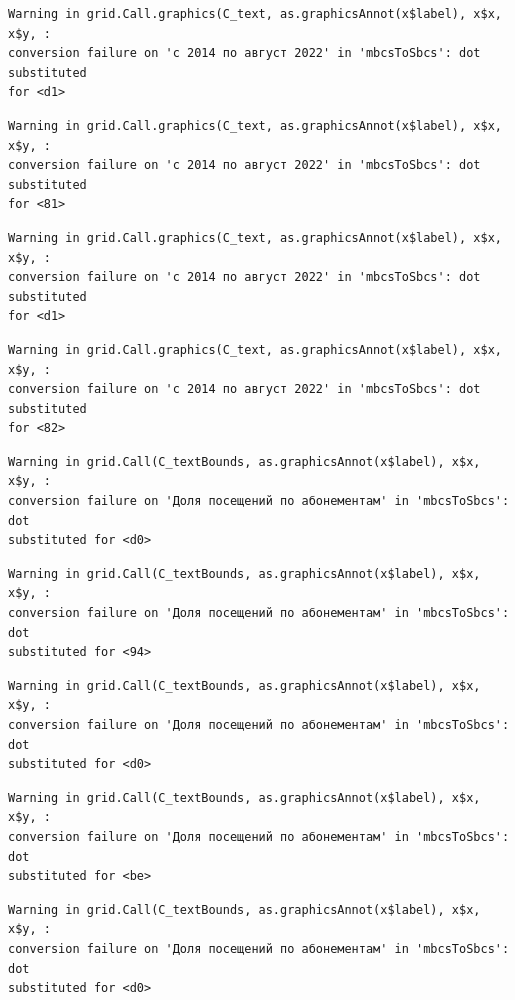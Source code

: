 \documentclass[
  letterpaper,
  DIV=11,
  numbers=noendperiod]{scrartcl}
\begin{document}
\begin{verbatim}
Warning in grid.Call.graphics(C_text, as.graphicsAnnot(x$label), x$x, x$y, :
conversion failure on 'с 2014 по август 2022' in 'mbcsToSbcs': dot substituted
for <d1>
\end{verbatim}

\begin{verbatim}
Warning in grid.Call.graphics(C_text, as.graphicsAnnot(x$label), x$x, x$y, :
conversion failure on 'с 2014 по август 2022' in 'mbcsToSbcs': dot substituted
for <81>
\end{verbatim}

\begin{verbatim}
Warning in grid.Call.graphics(C_text, as.graphicsAnnot(x$label), x$x, x$y, :
conversion failure on 'с 2014 по август 2022' in 'mbcsToSbcs': dot substituted
for <d1>
\end{verbatim}

\begin{verbatim}
Warning in grid.Call.graphics(C_text, as.graphicsAnnot(x$label), x$x, x$y, :
conversion failure on 'с 2014 по август 2022' in 'mbcsToSbcs': dot substituted
for <82>
\end{verbatim}

\begin{verbatim}
Warning in grid.Call(C_textBounds, as.graphicsAnnot(x$label), x$x, x$y, :
conversion failure on 'Доля посещений по абонементам' in 'mbcsToSbcs': dot
substituted for <d0>
\end{verbatim}

\begin{verbatim}
Warning in grid.Call(C_textBounds, as.graphicsAnnot(x$label), x$x, x$y, :
conversion failure on 'Доля посещений по абонементам' in 'mbcsToSbcs': dot
substituted for <94>
\end{verbatim}

\begin{verbatim}
Warning in grid.Call(C_textBounds, as.graphicsAnnot(x$label), x$x, x$y, :
conversion failure on 'Доля посещений по абонементам' in 'mbcsToSbcs': dot
substituted for <d0>
\end{verbatim}

\begin{verbatim}
Warning in grid.Call(C_textBounds, as.graphicsAnnot(x$label), x$x, x$y, :
conversion failure on 'Доля посещений по абонементам' in 'mbcsToSbcs': dot
substituted for <be>
\end{verbatim}

\begin{verbatim}
Warning in grid.Call(C_textBounds, as.graphicsAnnot(x$label), x$x, x$y, :
conversion failure on 'Доля посещений по абонементам' in 'mbcsToSbcs': dot
substituted for <d0>
\end{verbatim}
\end{document}
